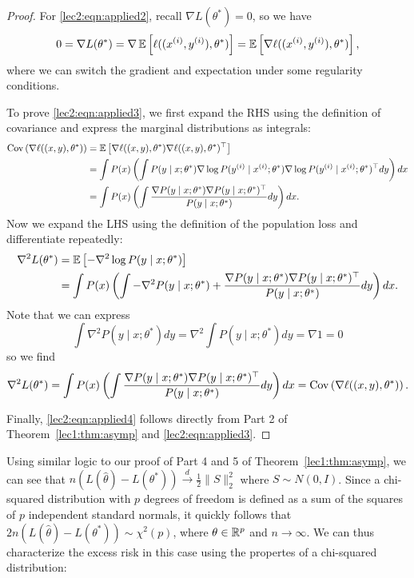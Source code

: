 \begin{proof}
For \eqref{lec2:eqn:applied2}, recall $\nabla L(\theta^*) = 0$, so we have
\begin{equation}
0 = \nabla L(\theta^*) = \nabla \operatorname*{\mathbb{E}} \left[ \ell((x^{(i)}, y^{(i)}), \theta^*) \right] = \operatorname*{\mathbb{E}} \left[ \nabla \ell((x^{(i)}, y^{(i)}), \theta^*) \right],
\end{equation}
where we can switch the gradient and expectation under some regularity conditions.

To prove \eqref{lec2:eqn:applied3}, we first expand the RHS using the definition of covariance and express the marginal distributions as integrals:
\begin{align}
    \operatorname{Cov} \left( \nabla \ell ((x, y), \theta^*) \right) &= \operatorname*{\mathbb{E}} \left[ \nabla \ell ((x, y), \theta^*) \nabla \ell ((x, y), \theta^*)^\top \right] \\
    &= \int P(x) \left( \int P(y \mid x; \theta^*) \nabla \log P( y^{(i)} \mid x^{(i)} ; \theta^*) \nabla \log P( y^{(i)} \mid x^{(i)} ; \theta^*)^\top dy \right) dx \\
    &= \int P(x) \left( \int \frac{\nabla P(y \mid x; \theta^*) \nabla P(y \mid x; \theta^*)^\top}{P(y \mid x; \theta^*)}dy \right) dx.
\end{align}
Now we expand the LHS using the definition of the population loss and differentiate repeatedly:
\begin{align}
    \nabla^2 L(\theta^*) &= \operatorname*{\mathbb{E}} \left[- \nabla^2 \log P(y \mid x; \theta^*) \right] \\
    &= \int P(x) \left( \int - \nabla^2 P(y \mid x; \theta^*) + \frac{\nabla P(y \mid x; \theta^*) \nabla P(y \mid x; \theta^*)^\top}{P(y \mid x; \theta^*)}dy  \right) dx.
\end{align}
Note that we can express 
\begin{equation} \int \nabla^2 P(y \mid x; \theta^*) dy = \nabla^2 \int P(y \mid x; \theta^*) dy = \nabla 1  = 0 \end{equation}
so we find
\begin{equation} \nabla^2 L(\theta^*) = \int P(x) \left( \int \frac{\nabla P(y \mid x; \theta^*) \nabla P(y \mid x; \theta^*)^\top}{P(y \mid x; \theta^*)}dy \right) dx = \operatorname{Cov} \left( \nabla \ell ((x, y), \theta^*) \right). \end{equation}

Finally, \eqref{lec2:eqn:applied4} follows directly from Part 2 of Theorem~\ref{lec1:thm:asymp} and \eqref{lec2:eqn:applied3}.
\end{proof}

Using similar logic to our proof of Part 4 and 5 of Theorem~\ref{lec1:thm:asymp}, we can see that $n (L(\hat \theta) - L(\theta^*)) \overset d \to \frac12 \|S\|_2^2$ where $S \sim N(0, I)$. Since a chi-squared distribution with $p$ degrees of freedom is defined as a sum of the squares of $p$ independent standard normals, it quickly follows that $2n (L(\hat \theta) - L(\theta^*)) \sim  \chi^2(p)$, where $\theta \in \mathbb R^p$ and $n \to \infty$. We can thus characterize the excess risk in this case using the propertes of a chi-squared distribution:

